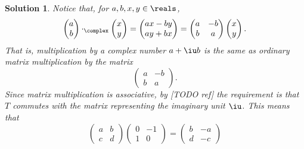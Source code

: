 \documentclass[article, a4paper, 11pt, oneside]{memoir}
\numberwithin{equation}{chapter}
\theoremstyle{nonumberplain}
\newtheorem{solution}{Solution}
\begin{document}
\begin{solution}
    Notice that, for $a,b,x,y \in \reals$,
    \begin{equation*}
        \begin{pmatrix}
            a \\
            b
        \end{pmatrix}
        \cdot_\complex
        \begin{pmatrix}
            x \\
            y
        \end{pmatrix}
        =
        \begin{pmatrix}
            ax - by \\
            ay + bx
        \end{pmatrix}
        =
        \begin{pmatrix}
            a & -b \\
            b & a
        \end{pmatrix}
        \begin{pmatrix}
            x \\
            y
        \end{pmatrix}.
    \end{equation*}
    That is, multiplication by a complex number $a + \iu b$ is the same as ordinary matrix multiplication by the matrix
    \begin{equation*}
        \begin{pmatrix}
            a & -b \\
            b & a
        \end{pmatrix}.
    \end{equation*}
    Since matrix multiplication is associative, by [TODO ref] the requirement is that $T$ commutes with the matrix representing the imaginary unit $\iu$. This means that
    \begin{equation*}
        \begin{pmatrix}
            a & b \\
            c & d
        \end{pmatrix}
        \begin{pmatrix}
            0 & -1 \\
            1 & 0
        \end{pmatrix}
        =
        \begin{pmatrix}
            b & -a \\
            d & -c
        \end{pmatrix}

\end{equation*}
\end{solution}
\end{document}
